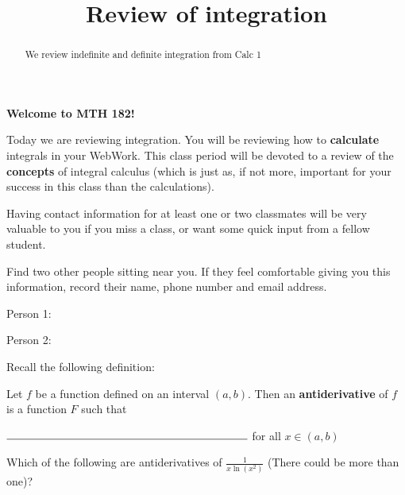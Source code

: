 \documentclass[handout]{ximera}
\title{Review of integration}
\begin{document}
\begin{abstract}
We review indefinite and definite integration from Calc 1
\end{abstract}
\maketitle

\begin{center}
\large{\textbf{Welcome to MTH 182!}}
\end{center}

 Today we are reviewing integration.  You will be reviewing how to \textbf{calculate} integrals in your WebWork.  This class period will be devoted to a review of the \textbf{concepts} of integral calculus (which is just as, if not more, important for your success in this class than the calculations).
 
\begin{exercise}
	
	Having contact information for at least one or two classmates will be very valuable to you if you miss a class, or want some quick input from a fellow student.
	
   	Find two other people sitting near you.  If they feel comfortable giving you this information, record their name, phone number and email address.
   	
   	Person 1:

	Person 2:
	

\end{exercise}


 
 Recall the following definition:
 
\begin{definition}
		Let $f$ be a function defined on an interval $(a,b)$.  Then an \textbf{antiderivative} of $f$ is a function $F$ such that 
		
		\begin{center}$\rule{3 in}{0.15mm}$ for all $x \in (a,b)$
		\end{center}
\end{definition}

\begin{question}
	Which of the following are antiderivatives of $\frac{1}{x\ln(x^2)}$ (There could be more than one)?
	\begin{selectAll}
	\end{selectAll}
\end{question}
 
\end{document}
